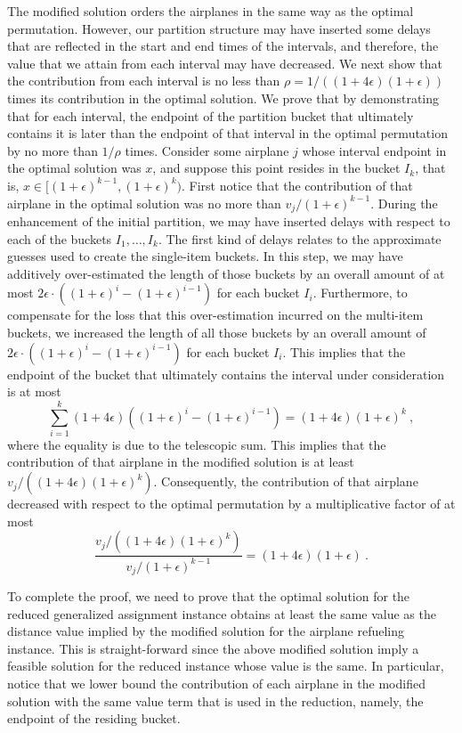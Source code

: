 \documentclass[11pt]{article}
\theoremstyle{plain}
\theoremstyle{definition}
\begin{document}
The modified solution orders the airplanes in the same way as the optimal permutation. However, our partition structure may have inserted some delays that are reflected in the start and end times of the intervals, and therefore, the value that we attain from each interval may have decreased. We next show that the contribution from each interval is no less than $\rho = 1 / ((1+4\epsilon)(1+\epsilon))$ times its contribution in the optimal solution. We prove that by demonstrating that for each interval, the endpoint of the partition bucket that ultimately contains it is later than the endpoint of that interval in the optimal permutation by no more than $1/\rho$ times. Consider some airplane $j$ whose interval endpoint in the optimal solution was $x$, and suppose this point resides in the bucket $I_k$, that is, $x \in [(1+\epsilon)^{k-1},(1+\epsilon)^k)$. First notice that the contribution of that airplane in the optimal solution was no more than $v_j / (1+\epsilon)^{k-1}$. During the enhancement of the initial partition, we may have inserted delays with respect to each of the buckets $I_1, \ldots, I_k$. The first kind of delays relates to the approximate guesses used to create the single-item buckets. In this step, we may have additively over-estimated the length of those buckets by an overall amount of at most $2 \epsilon \cdot ((1+\epsilon)^i - (1+\epsilon)^{i-1})$ for each bucket $I_i$. Furthermore, to compensate for the loss that this over-estimation incurred on the multi-item buckets, we increased the length of all those buckets by an overall amount of $2 \epsilon \cdot((1+\epsilon)^i - (1+\epsilon)^{i-1})$ for each bucket $I_i$. This implies that the endpoint of the bucket that ultimately contains the interval under consideration is at most
$$
\sum_{i=1}^k (1 + 4 \epsilon) \left((1+\epsilon)^i - (1+\epsilon)^{i-1}\right) =
(1+ 4 \epsilon) (1+\epsilon)^k \ ,
$$
where the equality is due to the telescopic sum. This implies that the contribution of that airplane in the modified solution is at least $v_j / ((1+ 4 \epsilon) (1+\epsilon)^k)$. Consequently, the contribution of that airplane decreased with respect to the optimal permutation by a multiplicative factor of at most
$$
\frac{v_j / ((1+ 4 \epsilon) (1+\epsilon)^k)}{v_j / (1+\epsilon)^{k-1}} =
(1+ 4 \epsilon)(1+\epsilon) \ .
$$

To complete the proof, we need to prove that the optimal solution for the reduced generalized assignment instance obtains at least the same value as the distance value implied by the modified solution for the airplane refueling instance. This is straight-forward since the above modified solution imply a feasible solution for the reduced instance whose value is the same. In particular, notice that we lower bound the contribution of each airplane in the modified solution with the same value term that is used in the reduction, namely, the endpoint of the residing bucket.
\end{document}
